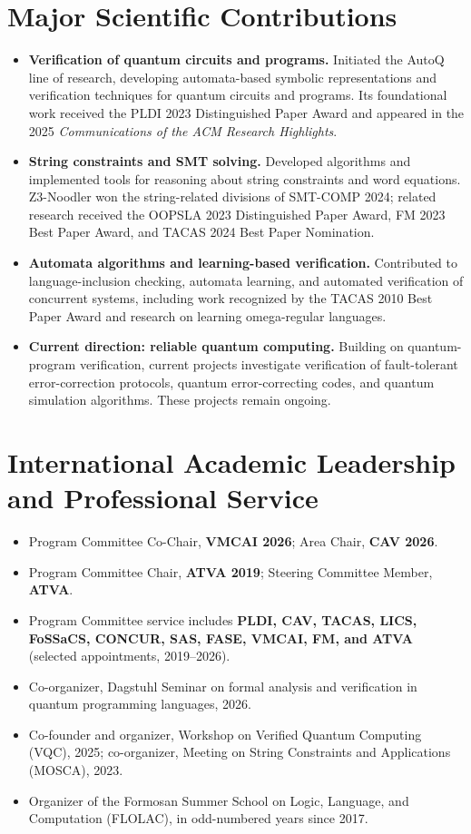 \documentclass[11pt,a4paper]{article}
\begin{document}
\section{Major Scientific Contributions}
\begin{itemize}
\item \textbf{Verification of quantum circuits and programs.} Initiated the AutoQ line of research, developing automata-based symbolic representations and verification techniques for quantum circuits and programs. Its foundational work received the PLDI 2023 Distinguished Paper Award and appeared in the 2025 \emph{Communications of the ACM Research Highlights}.
\item \textbf{String constraints and SMT solving.} Developed algorithms and implemented tools for reasoning about string constraints and word equations. Z3-Noodler won the string-related divisions of SMT-COMP 2024; related research received the OOPSLA 2023 Distinguished Paper Award, FM 2023 Best Paper Award, and TACAS 2024 Best Paper Nomination.
\item \textbf{Automata algorithms and learning-based verification.} Contributed to language-inclusion checking, automata learning, and automated verification of concurrent systems, including work recognized by the TACAS 2010 Best Paper Award and research on learning omega-regular languages.
\item \textbf{Current direction: reliable quantum computing.} Building on quantum-program verification, current projects investigate verification of fault-tolerant error-correction protocols, quantum error-correcting codes, and quantum simulation algorithms. These projects remain ongoing.
\end{itemize}

\section{International Academic Leadership and Professional Service}
\begin{itemize}
\item Program Committee Co-Chair, \textbf{VMCAI 2026}; Area Chair, \textbf{CAV 2026}.
\item Program Committee Chair, \textbf{ATVA 2019}; Steering Committee Member, \textbf{ATVA}.
\item Program Committee service includes \textbf{PLDI, CAV, TACAS, LICS, FoSSaCS, CONCUR, SAS, FASE, VMCAI, FM, and ATVA} (selected appointments, 2019--2026).
\item Co-organizer, Dagstuhl Seminar on formal analysis and verification in quantum programming languages, 2026.
\item Co-founder and organizer, Workshop on Verified Quantum Computing (VQC), 2025; co-organizer, Meeting on String Constraints and Applications (MOSCA), 2023.
\item Organizer of the Formosan Summer School on Logic, Language, and Computation (FLOLAC), in odd-numbered years since 2017.
\end{itemize}
\end{document}
